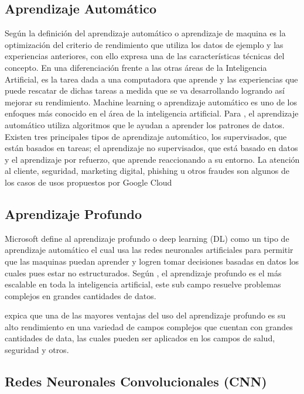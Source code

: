 \subsection{Aprendizaje Automático}

Según \cite{soria} la definición del aprendizaje automático o aprendizaje de maquina es la optimización del criterio de rendimiento que utiliza los datos de ejemplo y las experiencias anteriores, con ello expresa una de las características técnicas del concepto. En una diferenciación frente a las otras áreas de la Inteligencia Artificial, es la tarea dada a una computadora que aprende y las experiencias que puede rescatar de dichas tareas a medida que se va desarrollando logrando así mejorar su rendimiento. 
Machine learning o aprendizaje automático es uno de los enfoques más conocido en el área de la inteligencia artificial. Para \cite{Rouhiainen}, el aprendizaje automático utiliza algoritmos que le ayudan a aprender los patrones de datos. 
Existen tres principales tipos de aprendizaje automático, los supervisados, que están basados en tareas; el aprendizaje no supervisados, que está basado en datos y el aprendizaje por refuerzo, que aprende reaccionando a su entorno. 
La atención al cliente, seguridad, marketing digital, phishing u otros fraudes son algunos de los casos de usos propuestos por Google Cloud

\subsection{Aprendizaje Profundo}

Microsoft define al aprendizaje profundo o deep learning (DL) como un tipo de aprendizaje automático el cual usa las redes neuronales artificiales para permitir que las maquinas puedan aprender y logren tomar decisiones basadas en datos los cuales pues estar no estructurados. Según \cite{Rouhiainen}, el aprendizaje profundo es el más escalable en toda la inteligencia artificial, este sub campo resuelve problemas complejos en grandes cantidades de datos.  

\cite{xin2018machine} expica que una de las mayores ventajas del uso del aprendizaje profundo es su alto rendimiento en una variedad de campos complejos que cuentan con grandes cantidades de data, las cuales pueden ser aplicados en los campos de salud, seguridad y otros. 


\subsection{Redes Neuronales Convolucionales (CNN)}

